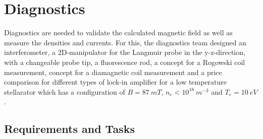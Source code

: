 \section{Diagnostics}



Diagnostics are needed to validate the calculated magnetic field as well as measure the densities and currents. For this, the diagnostics team designed an interferometer, a 2D-manipulator for the Langmuir probe in the y-z-direction, with a changeable probe tip, a fluorescence rod, a concept for
a Rogowski coil measurement, concept for a diamagnetic coil measurement and a price comparison for different types of lock-in amplifier for a low temperature stellarator which has a configuration of $B=87~\unit{mT}$, $n_e < 10^{18}~\unit{m^{-3}}$ and $T_e=10~\unit{eV}$.


\subsection{Requirements and Tasks}


